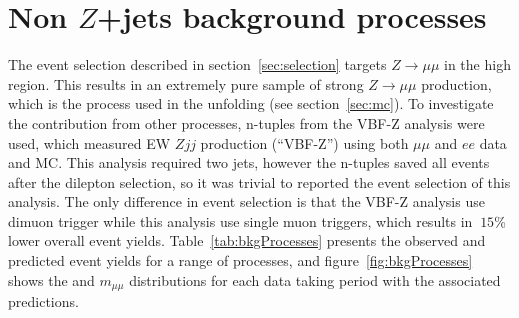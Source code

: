 \section{Non $Z$+jets background processes}
\label{app:bkg-processes}

The event selection described in section~\ref{sec:selection} targets $Z\to\mu\mu$ in the high \pTll{} region. This results in an extremely pure sample of strong $Z\to\mu\mu$ production, which is the process used in the unfolding (see section~\ref{sec:mc}). To investigate the contribution from other processes, n-tuples from the VBF-Z analysis were used, which measured EW $Zjj$ production (``VBF-Z'') using both $\mu\mu$ and $ee$ data and MC. This analysis required two jets, however the n-tuples saved all events after the dilepton selection, so it was trivial to reported the event selection of this analysis. The only difference in event selection is that the VBF-Z analysis use dimuon trigger while this analysis use single muon triggers, which results in $~15$\% lower overall event yields. Table~\ref{tab:bkgProcesses} presents the observed and predicted event yields for a range of processes, and figure~\ref{fig:bkgProcesses} shows the \ptll{} and $m_{\mu\mu}$ distributions for each data taking period with the associated predictions.

